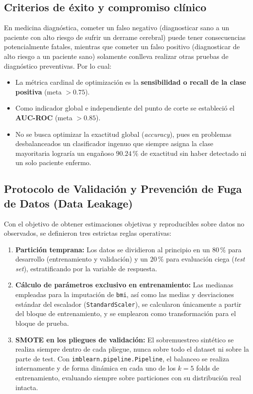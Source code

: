 \documentclass[12pt,a4paper]{article}
\begin{document}
\subsection{Criterios de éxito y compromiso clínico}
En medicina diagnóstica, cometer un falso negativo (diagnosticar sano a un paciente con alto riesgo de sufrir un derrame cerebral) puede tener consecuencias potencialmente fatales, mientras que cometer un falso positivo (diagnosticar de alto riesgo a un paciente sano) solamente conlleva realizar otras pruebas de diagnóstico preventivas. Por lo cual:
\begin{itemize}[itemsep=0.3em,leftmargin=1.2cm]
    \item La métrica cardinal de optimización es la \textbf{ sensibilidad o recall de la clase positiva } (meta $> 0.75$).
    \item Como indicador global e independiente del punto de corte se estableció el \textbf{AUC-ROC} (meta $> 0.85$).
    \item No se busca optimizar la exactitud global (\textit{accuracy}), pues en problemas desbalanceados un clasificador ingenuo que siempre asigna la clase mayoritaria lograría un engañoso $90.24\,\%$ de exactitud sin haber detectado ni un solo paciente enfermo.
\end{itemize}

\subsection{Protocolo de Validación y Prevención de Fuga de Datos (Data Leakage)}
Con el objetivo de obtener estimaciones objetivas y reproducibles sobre datos no observados, se definieron tres estrictas reglas operativas:
\begin{enumerate}[leftmargin=1.2cm,itemsep=0.3em]
    \item \textbf{Partición temprana:} Los datos se dividieron al principio en un $80\,\%$ para desarrollo (entrenamiento y validación) y un $20\,\%$ para evaluación ciega (\textit{test set}), estratificando por la variable de respuesta.
    \item \textbf{Cálculo de parámetros exclusivo en entrenamiento:} Las medianas empleadas para la imputación de \texttt{bmi}, así como las medias y desviaciones estándar del escalador (\texttt{StandardScaler}), se calcularon únicamente a partir del bloque de entrenamiento, y se emplearon como transformación para el bloque de prueba.
    \item \textbf{SMOTE en los pliegues de validación:} El sobremuestreo sintético se realiza siempre dentro de cada pliegue, nunca sobre todo el dataset ni sobre la parte de test. Con \texttt{imblearn.pipeline.Pipeline}, el balanceo se realiza internamente y de forma dinámica en cada uno de los $k=5$ folds de entrenamiento, evaluando siempre sobre particiones con su distribución real intacta.
\end{enumerate}
\end{document}
